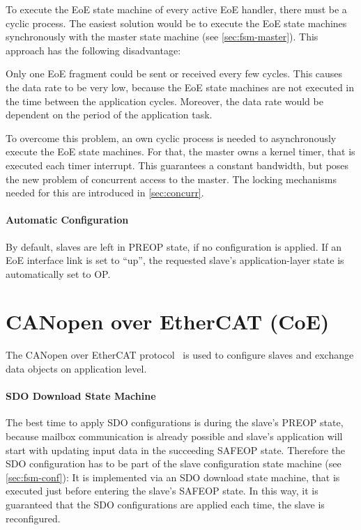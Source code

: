 \documentclass[a4paper,12pt,BCOR6mm,bibtotoc,idxtotoc]{scrbook}
\begin{document}
To execute the EoE state machine of every active EoE handler, there must be a
cyclic process. The easiest solution would be to execute the EoE state
machines synchronously with the master state machine (see
\autoref{sec:fsm-master}). This approach has the following disadvantage:

Only one EoE fragment could be sent or received every few cycles. This
causes the data rate to be very low, because the EoE state machines are not
executed in the time between the application cycles. Moreover, the data rate
would be dependent on the period of the application task.

To overcome this problem, an own cyclic process is needed to asynchronously
execute the EoE state machines. For that, the master owns a kernel timer, that
is executed each timer interrupt. This guarantees a constant bandwidth, but
poses the new problem of concurrent access to the master. The locking
mechanisms needed for this are introduced in \autoref{sec:concurr}.

\paragraph{Automatic Configuration}

By default, slaves are left in PREOP state, if no configuration is applied. If
an EoE interface link is set to ``up'', the requested slave's
application-layer state is automatically set to OP.


\section{CANopen over EtherCAT (CoE)}
\label{sec:coe}

The CANopen over EtherCAT protocol~\cite[sec.~5.6]{alspec} is used to configure slaves and
exchange data objects on application level.

%
%

\paragraph{SDO Download State Machine}

The best time to apply SDO configurations is during the slave's PREOP state,
because mailbox communication is already possible and slave's application will
start with updating input data in the succeeding SAFEOP state. Therefore the
SDO configuration has to be part of the slave configuration state machine (see
\autoref{sec:fsm-conf}): It is implemented via an SDO download state machine,
that is executed just before entering the slave's SAFEOP state. In this way,
it is guaranteed that the SDO configurations are applied each time, the slave
is reconfigured.
\end{document}
